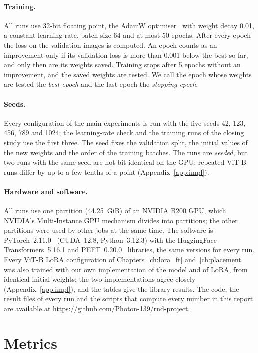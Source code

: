\paragraph{Training.} All runs use 32-bit floating point, the AdamW optimiser~\cite{loshchilov2019adamw} with
weight decay 0.01, a constant learning rate, batch size 64 and at most 50 epochs. After every epoch the loss on the
validation images is computed. An epoch counts as an improvement only if its validation loss is more than 0.001
below the best so far, and only then are its weights saved. Training stops after 5 epochs without an improvement,
and the saved weights are tested. We call the epoch whose weights are tested the \emph{best epoch} and the last
epoch the \emph{stopping epoch}.

\paragraph{Seeds.} Every configuration of the main experiments is run with the five seeds 42, 123, 456, 789 and
1024; the learning-rate check and the training runs of the closing study use the first three. The seed fixes the
validation split, the initial values of the new weights and the order of the training batches. The runs are
\emph{seeded}, but two runs with the same seed are not bit-identical on the GPU; repeated ViT-B runs differ by up to
a few tenths of a point (Appendix~\ref{app:impl}).

\paragraph{Hardware and software.} All runs use one partition (44.25~GiB) of an NVIDIA B200 GPU, which NVIDIA's
Multi-Instance GPU mechanism divides into partitions; the other partitions were used by other jobs at the same
time. The software is PyTorch~2.11.0~\cite{paszke2019pytorch} (CUDA~12.8, Python~3.12.3) with the HuggingFace
Transformers~5.16.1 and PEFT~0.20.0~\cite{mangrulkar2022peft} libraries, the same versions for every run. Every ViT-B LoRA configuration of Chapters~\ref{ch:lora_ft} and~\ref{ch:placement} was also trained with our own
implementation of the model and of LoRA, from identical initial weights; the two implementations agree closely
(Appendix~\ref{app:impl}), and the tables give the library results. The code, the result files of every run and
the scripts that compute every number in this report are available at
\url{https://github.com/Photon-139/rnd-project}.

\section{Metrics}
\label{sec:metrics}

